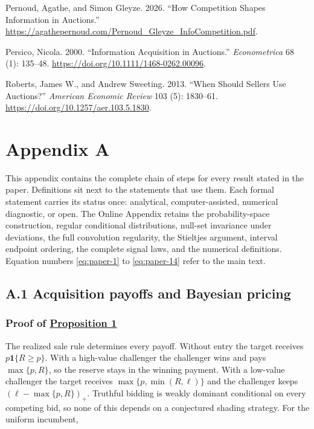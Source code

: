 \documentclass[
  12pt,
]{article}
\newlength{\cslhangindent}
\newenvironment{CSLReferences}[2] %
 {\begin{list}{}{%
  \setlength{\itemindent}{0pt}
  \setlength{\leftmargin}{0pt}
  \setlength{\parsep}{0pt}
  \ifodd #1
   \setlength{\leftmargin}{\cslhangindent}
   \setlength{\itemindent}{-1\cslhangindent}
  \fi
  \setlength{\itemsep}{#2\baselineskip}}}
 {\end{list}}
\begin{document}
\begin{CSLReferences}{1}{1}
Pernoud, Agathe, and Simon Gleyze. 2026. {``How Competition Shapes
Information in Auctions.''}
\url{https://agathepernoud.com/Pernoud_Gleyze_InfoCompetition.pdf}.

Persico, Nicola. 2000. {``Information Acquisition in Auctions.''}
\emph{Econometrica} 68 (1): 135--48.
\url{https://doi.org/10.1111/1468-0262.00096}.

Roberts, James W., and Andrew Sweeting. 2013. {``When Should Sellers Use
Auctions?''} \emph{American Economic Review} 103 (5): 1830--61.
\url{https://doi.org/10.1257/aer.103.5.1830}.

\end{CSLReferences}

\clearpage

\section{Appendix A}\label{paper-appendix}

This appendix contains the complete chain of steps for every result
stated in the paper. Definitions sit next to the statements that use
them. Each formal statement carries its status once: analytical,
computer-assisted, numerical diagnostic, or open. The Online Appendix
retains the probability-space construction, regular conditional
distributions, null-set invariance under deviations, the full
convolution regularity, the Stieltjes argument, interval endpoint
ordering, the complete signal laws, and the numerical definitions.
Equation numbers \eqref{eq:paper-1} to \eqref{eq:paper-14} refer to the
main text.

\subsection{A.1 Acquisition payoffs and Bayesian
pricing}\label{pa-results}

\subsubsection{\texorpdfstring{Proof of
\hyperref[result-proposition-1]{Proposition
1}}{Proof of Proposition 1}}\label{proof-of-proposition-1}

The realized sale rule determines every payoff. Without entry the target
receives \(p\mathbf1\{R\ge p\}\). With a high-value challenger the
challenger wins and pays \(\max\{p,R\}\), so the reserve stays in the
winning payment. With a low-value challenger the target receives
\(\max\{p,\min(R,\ell)\}\) and the challenger keeps
\((\ell-\max\{p,R\})_+\). Truthful bidding is weakly dominant
conditional on every competing bid, so none of this depends on a
conjectured shading strategy. For the uniform incumbent,
\end{document}
